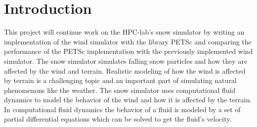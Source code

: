 \chapter{Introduction}

This project will continue work on the HPC-lab's snow simulator by writing an
implementation of the wind simulator with the library PETSc and comparing the
performance of the PETSc implementation with the previously implemented wind
simulator. The snow simulator simulates falling snow particles and how they are
affected by the wind and terrain. Realistic modeling of how the wind is affected
by terrain is a challenging topic and an important part of simulating natural
phenomenons like the weather. The snow simulator uses computational fluid dynamics
to model the behavior of the wind and how it is affected by the terrain.
In computational fluid dynamics the behavior of a fluid is modeled by a set of
partial differential equations which can be solved to get the fluid's velocity.





